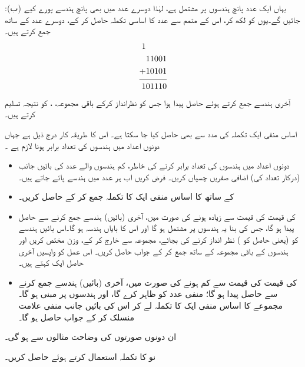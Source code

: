 :\quad (ب) یہاں ایک عدد پانچ ہندسوں پر مشتمل ہے، لہٰذا دوسرے عدد میں بھی پانچ ہندسے پورے کیے جائیں گے۔یوں  کو  لکھ کر، اس کے متمم 
  سے عدد کا اساسی تکملہ  حاصل کر کے، دوسرے عدد کے ساتھ جمع کرتے ہیں۔
\begin{align*}
\begin{split}
1\phantom{11001}&\\
11001&\\
+10101&\\
\noalign{\smallskip}\hline\noalign{\smallskip}
101110&
\end{split}
\end{align*}
آخری ہندسے جمع کرتے ہوئے حاصل  پیدا ہوا جس کو نظرانداز کرکے باقی مجموعہ،  ، کو نتیجہ تسلیم کرتے ہیں۔


اساس منفی ایک تکملہ کی مدد سے بھی  حاصل کیا جا سکتا ہے۔ اس کا طریقہ کار درج ذیل ہے جہاں دونوں اعداد میں ہندسوں کی تعداد برابر ہونا لازم ہے ۔
\begin{itemize}
 \item
 دونوں اعداد میں ہندسوں کی تعداد برابر کرنے کی خاطر، کم ہندسوں والے عدد کی بائیں جانب (درکار تعداد کی) اضافی صفریں چسپاں کریں۔ فرض کریں اب ہر عدد میں  ہندسے پائے جاتے ہیں۔ 
 \item
  کے ساتھ  کا اساس منفی ایک کا تکملہ جمع کر کے   حاصل کریں۔
 \item
  کی قیمت  کی قیمت سے زیادہ ہونے کی صورت میں، آخری (بائیں) ہندسے جمع کرنے سے حاصل  پیدا ہو گا، جس کی بنا یہ   ہندسوں پر مشتمل ہو گا اور اس کا بایاں ہندسہ  ہو گا۔اس بائیں ہندسے کو (یعنی حاصل  کو ) نظر انداز کرنے کی بجائے، مجموعہ سے خارج کر کے،  وزن مختص کریں اور  ہندسوں کے باقی مجموعہ کے ساتھ جمع کر کے جواب حاصل کریں۔ اس عمل کو واپسیں آخری حاصل ایک  کہتے ہیں۔
 \item
{}کی قیمت  کی قیمت سے کم ہونے کی صورت میں، آخری (بائیں) ہندسے جمع کرنے سے حاصل  پیدا  ہو گا؛  منفی عدد کو ظاہر کرے گا، اور  ہندسوں پر مبنی ہو گا۔مجموعے کا اساس منفی ایک کا تکملہ لے کر اس کی بائیں جانب منفی علامت منسلک کر کے جواب حاصل ہو گا۔
\end{itemize}
ان دونوں صورتوں کی وضاحت مثالوں سے ہو گی۔ 

نو کا تکملہ استعمال کرتے ہوئے  حاصل کریں۔ 

